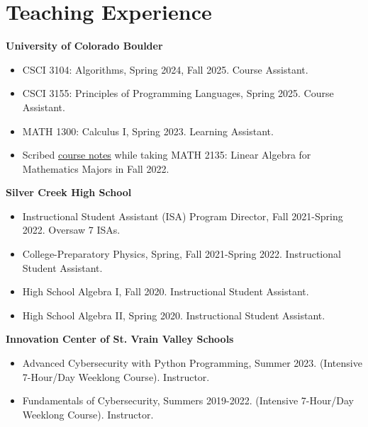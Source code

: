 \documentclass[a4paper,20pt]{article}
\begin{document}
    \section{Teaching Experience}
      \textbf{University of Colorado Boulder}
      \begin{itemize}
        \vspace{-5pt}
        \item CSCI 3104: Algorithms, Spring 2024, Fall 2025. Course Assistant.
        \vspace{-5pt}
        \item CSCI 3155: Principles of Programming Languages, Spring 2025. Course Assistant.
        \vspace{-5pt}
        \item MATH 1300: Calculus I, Spring 2023. Learning Assistant.
        \vspace{-5pt}
        \item Scribed \href{https://officialadithya.github.io/assets/pdf/course_materials/linearalgebra.pdf}{course notes} while taking MATH 2135: Linear Algebra for Mathematics Majors in Fall 2022.
        \vspace{-5pt}
      \end{itemize}
      \textbf{Silver Creek High School}
      \begin{itemize}
          \vspace{-5pt}
          \item Instructional Student Assistant (ISA) Program Director, Fall 2021-Spring 2022. Oversaw 7 ISAs.
          \vspace{-5pt}
          \item College-Preparatory Physics, Spring, Fall 2021-Spring 2022. Instructional Student Assistant. 
          \vspace{-5pt}
          \item High School Algebra I, Fall 2020. Instructional Student Assistant. 
          \vspace{-5pt}
          \item High School Algebra II, Spring 2020. Instructional Student Assistant.
          \vspace{-5pt}
        \end{itemize}
        \textbf{Innovation Center of St. Vrain Valley Schools}
        \begin{itemize}
          \vspace{-5pt}
          \item Advanced Cybersecurity with Python Programming, Summer 2023. (Intensive 7-Hour/Day Weeklong Course). Instructor.
          \vspace{-5pt}
          \item Fundamentals of Cybersecurity, Summers 2019-2022. (Intensive 7-Hour/Day Weeklong Course). Instructor.
        \end{itemize}
      
\end{document}
